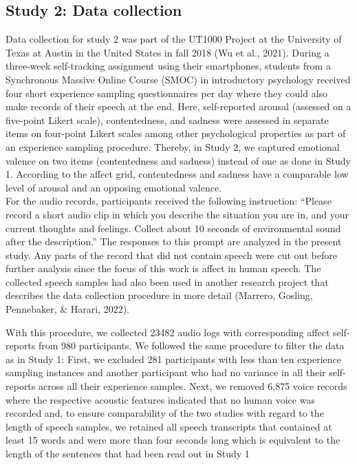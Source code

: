 \documentclass[
  english,
  man,floatsintext]{apa6}
\begin{document}
\hypertarget{study-2-data-collection}{%
\subsection{Study 2: Data collection}\label{study-2-data-collection}}

Data collection for study 2 was part of the UT1000 Project at the University of Texas at Austin in the United States in fall 2018 (Wu et al., 2021). During a three-week self-tracking assignment using their smartphones, students from a Synchronous Massive Online Course (SMOC) in introductory psychology received four short experience sampling questionnaires per day where they could also make records of their speech at the end. Here, self-reported arousal (assessed on a five-point Likert scale), contentedness, and sadness were assessed in separate items on four-point Likert scales among other psychological properties as part of an experience sampling procedure. Thereby, in Study 2, we captured emotional valence on two items (contentedness and sadness) instead of one as done in Study 1. According to the affect grid, contentedness and sadness have a comparable low level of arousal and an opposing emotional valence.\\
For the audio records, participants received the following instruction: ``Please record a short audio clip in which you describe the situation you are in, and your current thoughts and feelings. Collect about 10 seconds of environmental sound after the description.'' The responses to this prompt are analyzed in the present study. Any parts of the record that did not contain speech were cut out before further analysis since the focus of this work is affect in human speech. The collected speech samples had also been used in another research project that describes the data collection procedure in more detail (Marrero, Gosling, Pennebaker, \& Harari, 2022).

With this procedure, we collected 23482 audio logs with corresponding affect self-reports from 980 participants. We followed the same procedure to filter the data as in Study 1: First, we excluded 281 participants with less than ten experience sampling instances and another participant who had no variance in all their self-reports across all their experience samples. Next, we removed 6,875 voice records where the respective acoustic features indicated that no human voice was recorded and, to ensure comparability of the two studies with regard to the length of speech samples, we retained all speech transcripts that contained at least 15 words and were more than four seconds long which is equivalent to the length of the sentences that had been read out in Study 1
\end{document}
